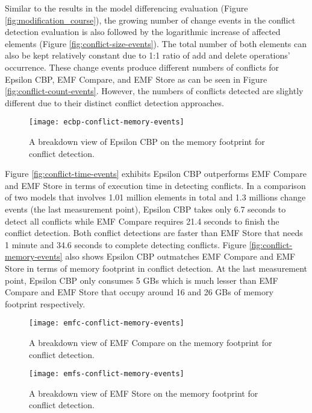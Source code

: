 Similar to the results in the model differencing evaluation (Figure \ref{fig:modification_course}), the growing number of change events in the conflict detection evaluation is also followed by the logarithmic increase of affected elements (Figure \ref{fig:conflict-size-events}). The total number of both elements can also be kept relatively constant due to 1:1 ratio of \textsf{add} and \textsf{delete} operations' occurrence. These change events produce different numbers of conflicts for Epsilon CBP, EMF Compare, and EMF Store as can be seen in Figure \ref{fig:conflict-count-events}. However, the numbers of conflicts detected are slightly different due to their distinct conflict detection approaches. 

\begin{wrapfigure}[14]{r}{0.5\textwidth}
  \vspace{-7pt}
  \texttt{[image: ecbp-conflict-memory-events]}
  \caption{A breakdown view of Epsilon CBP on the memory footprint for conflict detection.}
  \label{fig:ecbp-conflict-memory-events}
\end{wrapfigure}

Figure \ref{fig:conflict-time-events} exhibits Epsilon CBP outperforms EMF Compare and EMF Store in terms of execution time in detecting conflicts. In a comparison of two models that involves 1.01 million elements in total and 1.3 millions change events (the last measurement point), Epsilon CBP takes only 6.7 seconds to detect all conflicts while EMF Compare requires 21.4 seconds to finish the conflict detection. Both conflict detections are faster than EMF Store that needs 1 minute and 34.6 seconds to complete detecting conflicts. Figure \ref{fig:conflict-memory-events} also shows Epsilon CBP outmatches EMF Compare and EMF Store in terms of memory footprint in conflict detection. At the last measurement point, Epsilon CBP only consumes 5 GBs which is much lesser than EMF Compare and EMF Store that occupy around 16 and 26 GBs of memory footprint respectively.

\begin{figure}[ht]
  \begin{minipage}[b]{0.495\textwidth}
    \texttt{[image: emfc-conflict-memory-events]}
    \caption{A breakdown view of EMF Compare on the memory footprint for conflict detection.}
        \label{fig:emfc-conflict-memory-events}
  \end{minipage}
\hfill
  \begin{minipage}[b]{0.495\textwidth}
    \texttt{[image: emfs-conflict-memory-events]}
    \caption{A breakdown view of EMF Store on the memory footprint for conflict detection.}
    \label{fig:emfs-conflict-memory-events}
  \end{minipage}
\end{figure}

